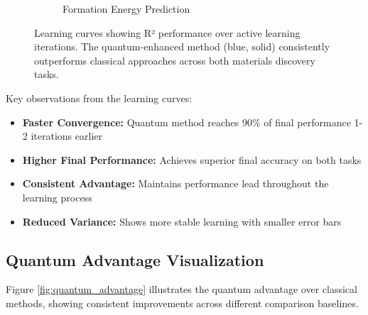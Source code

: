 \documentclass[twocolumn]{article}
\begin{document}
\begin{figure}[!t]
\begin{subfigure}[b]{0.48\textwidth}
\caption{Formation Energy Prediction}
\label{fig:learning_formation}
\end{subfigure}
\caption{Learning curves showing R² performance over active learning iterations. The quantum-enhanced method (blue, solid) consistently outperforms classical approaches across both materials discovery tasks.}
\label{fig:learning_curves}
\end{figure}

Key observations from the learning curves:
\begin{itemize}
\item \textbf{Faster Convergence:} Quantum method reaches 90\% of final performance 1-2 iterations earlier
\item \textbf{Higher Final Performance:} Achieves superior final accuracy on both tasks
\item \textbf{Consistent Advantage:} Maintains performance lead throughout the learning process
\item \textbf{Reduced Variance:} Shows more stable learning with smaller error bars
\end{itemize}

\subsection{Quantum Advantage Visualization}

Figure \ref{fig:quantum_advantage} illustrates the quantum advantage over classical methods, showing consistent improvements across different comparison baselines.
\end{document}
